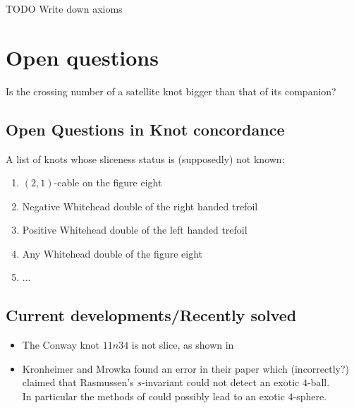 TODO Write down axioms





\section{Open questions}

\begin{openquestion}
	Is the crossing number of a satellite knot bigger than that of its companion?
\end{openquestion}



\subsection{Open Questions in Knot concordance}

A list of knots whose sliceness status is (supposedly) not known:
\begin{enumerate}
	\item $(2, 1)$-cable on the figure eight
	\item Negative Whitehead double of the right handed trefoil
	\item Positive Whitehead double of the left handed trefoil
	\item Any Whitehead double of the figure eight
	\item ...
\end{enumerate}


\subsection{Current developments/Recently solved}

\begin{itemize}
	\item The Conway knot $11n34$ is not slice, as shown
	in \citep{piccirillo2018conway}
	
	\item Kronheimer and Mrowka found an error
	in their paper \citep{kronheimer2013gauge} which
	(incorrectly?) claimed that Rasmussen's $s$-invariant could
	not detect an exotic $4$-ball. \\
	In particular the methods of
	\citep{freedman2009man} could possibly lead
	to an
	exotic $4$-sphere.
	
\end{itemize}
